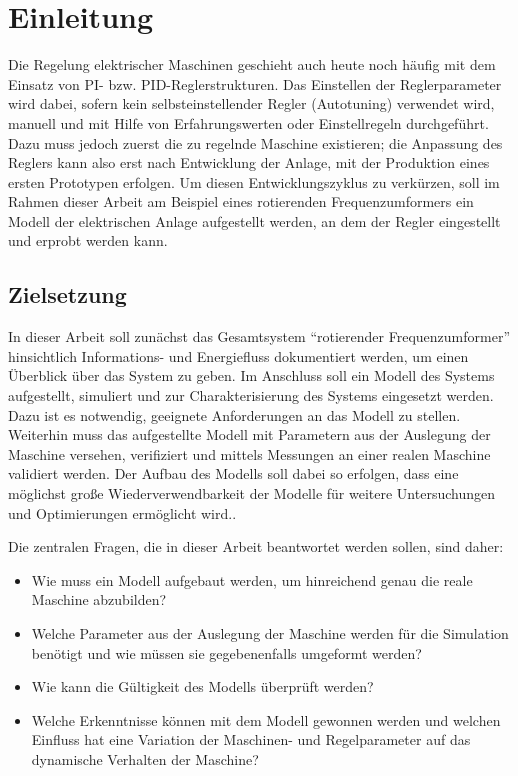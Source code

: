 \chapter{Einleitung}
\label{chap:Einleitung}
Die Regelung elektrischer Maschinen geschieht auch heute noch häufig mit
dem Einsatz von PI- bzw. PID-Reglerstrukturen. Das Einstellen der
Reglerparameter wird dabei, sofern kein selbsteinstellender Regler
(Autotuning) verwendet wird, manuell und mit Hilfe von Erfahrungswerten
oder Einstellregeln durchgeführt. Dazu muss jedoch zuerst die zu
regelnde Maschine existieren; die Anpassung des Reglers kann also erst
nach Entwicklung der Anlage, mit der Produktion eines ersten Prototypen
erfolgen. Um diesen Entwicklungszyklus zu verkürzen, soll im Rahmen
dieser Arbeit am Beispiel eines rotierenden Frequenzumformers ein Modell
der elektrischen Anlage aufgestellt werden, an dem der Regler
eingestellt und erprobt werden kann.

\section{Zielsetzung}
\label{sec:Zielsetzung}
In dieser Arbeit soll zunächst das Gesamtsystem ``rotierender
Frequenzumformer'' hinsichtlich Informations- und Energiefluss
dokumentiert werden, um einen Überblick über das System zu geben. Im
Anschluss soll ein Modell des Systems aufgestellt, simuliert und zur
Charakterisierung des Systems eingesetzt werden. Dazu ist es notwendig,
geeignete Anforderungen an das Modell zu stellen. Weiterhin muss das aufgestellte Modell
mit Parametern aus der Auslegung der Maschine versehen, verifiziert und mittels
Messungen an einer realen Maschine validiert werden. Der Aufbau des
Modells soll dabei so erfolgen, dass eine möglichst große
Wiederverwendbarkeit der Modelle für weitere Untersuchungen und Optimierungen ermöglicht wird..

Die zentralen Fragen, die in dieser Arbeit beantwortet werden sollen,
sind daher:
\begin{itemize}
\item Wie muss ein Modell aufgebaut werden, um hinreichend genau die reale Maschine abzubilden?
\item Welche Parameter aus der Auslegung der Maschine werden für die Simulation benötigt und wie müssen sie gegebenenfalls umgeformt werden?
\item Wie kann die Gültigkeit des Modells überprüft werden?
\item Welche Erkenntnisse können mit dem Modell gewonnen werden und welchen Einfluss hat eine Variation der Maschinen- und Regelparameter auf das dynamische Verhalten der Maschine?
\end{itemize}

